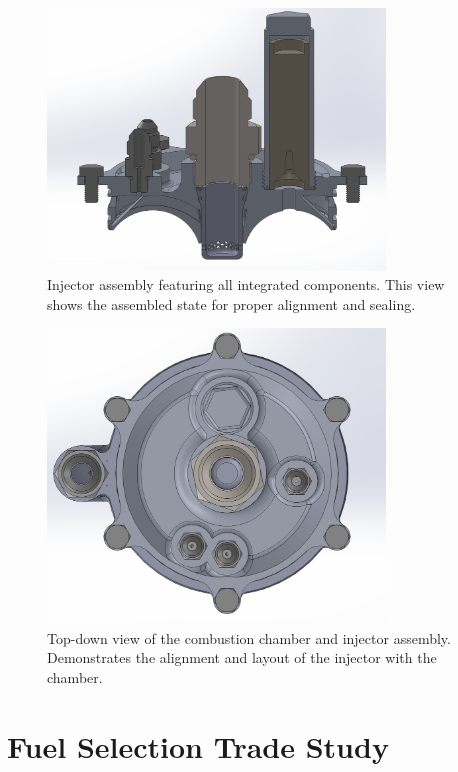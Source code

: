 \begin{figure}[H]
    \centering
    \includegraphics[width=0.8\textwidth]{Images/AnotherInjectorView.png}
    \caption{Injector assembly featuring all integrated components. This view shows the assembled state for proper alignment and sealing.}
    \label{fig:injector_assembly}
\end{figure}




\begin{figure}[H]
    \centering
    \includegraphics[width=0.8\textwidth]{Images/TopView.png}
    \caption{Top-down view of the combustion chamber and injector assembly. Demonstrates the alignment and layout of the injector with the chamber.}
    \label{fig:topview}
\end{figure}



\section{Fuel Selection Trade Study}

